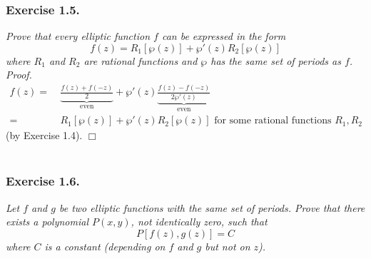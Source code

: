 \documentclass{article}
\begin{document}



\subsubsection*{Exercise 1.5.}
\emph{Prove that every elliptic function $f$ can be expressed in the form
\[
  f(z) = R_1[\wp(z)] + \wp'(z) R_2[\wp(z)]
\]
where $R_1$ and $R_2$ are rational functions and $\wp$ has the same set of periods as $f$.} \\



\emph{Proof.}
  \begin{align*}
    f(z)
    =&\:
    \underbrace{\frac{f(z)+f(-z)}{2}}_{\text{even}}
      + \wp'(z) \underbrace{\frac{f(z)-f(-z)}{2 \wp'(z)}}_{\text{even}} \\
    =&\: R_1[\wp(z)] + \wp'(z) R_2[\wp(z)]
      \text{ for some rational functions $R_1, R_2$}
  \end{align*}
  (by Exercise 1.4).
$\Box$ \\\\






\subsubsection*{Exercise 1.6.}
\emph{Let $f$ and $g$ be two elliptic functions with the same set of periods.
Prove that there exists a polynomial $P(x,y)$, not identically zero, such that
\[
  P[f(z),g(z)] = C
\]
where $C$ is a constant (depending on $f$ and $g$ but not on $z$).} \\
\end{document}

